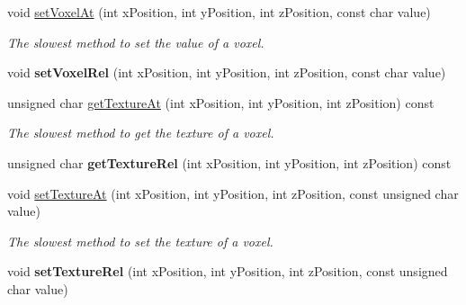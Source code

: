 \begin{DoxyCompactItemize}
\item 
\hypertarget{classVoxelVolume_a5e1bc4d1318f07dfa4ba76d803d4daf7}{
void \hyperlink{classVoxelVolume_a5e1bc4d1318f07dfa4ba76d803d4daf7}{set\-Voxel\-At} (int x\-Position, int y\-Position, int z\-Position, const char value)}
\label{d0/d1c/classVoxelVolume_a5e1bc4d1318f07dfa4ba76d803d4daf7}

\begin{DoxyCompactList}\small\item\em \-The slowest method to set the value of a voxel. \end{DoxyCompactList}\item 
\hypertarget{classVoxelVolume_a5b89179490cded3b88be626dce75ad6d}{
void {\bfseries set\-Voxel\-Rel} (int x\-Position, int y\-Position, int z\-Position, const char value)}
\label{d0/d1c/classVoxelVolume_a5b89179490cded3b88be626dce75ad6d}

\item 
\hypertarget{classVoxelVolume_a35d9969da031ff91493a28a1b0198990}{
unsigned char \hyperlink{classVoxelVolume_a35d9969da031ff91493a28a1b0198990}{get\-Texture\-At} (int x\-Position, int y\-Position, int z\-Position) const }
\label{d0/d1c/classVoxelVolume_a35d9969da031ff91493a28a1b0198990}

\begin{DoxyCompactList}\small\item\em \-The slowest method to get the texture of a voxel. \end{DoxyCompactList}\item 
\hypertarget{classVoxelVolume_a76cc383b2e014779b77aedbad680ba19}{
unsigned char {\bfseries get\-Texture\-Rel} (int x\-Position, int y\-Position, int z\-Position) const }
\label{d0/d1c/classVoxelVolume_a76cc383b2e014779b77aedbad680ba19}

\item 
\hypertarget{classVoxelVolume_aaf4744326247ec31706e2dfe8f587670}{
void \hyperlink{classVoxelVolume_aaf4744326247ec31706e2dfe8f587670}{set\-Texture\-At} (int x\-Position, int y\-Position, int z\-Position, const unsigned char value)}
\label{d0/d1c/classVoxelVolume_aaf4744326247ec31706e2dfe8f587670}

\begin{DoxyCompactList}\small\item\em \-The slowest method to set the texture of a voxel. \end{DoxyCompactList}\item 
\hypertarget{classVoxelVolume_a25cfdf1f0efd2a91201cf40e7042e1ec}{
void {\bfseries set\-Texture\-Rel} (int x\-Position, int y\-Position, int z\-Position, const unsigned char value)}
\label{d0/d1c/classVoxelVolume_a25cfdf1f0efd2a91201cf40e7042e1ec}


\end{DoxyCompactItemize}

